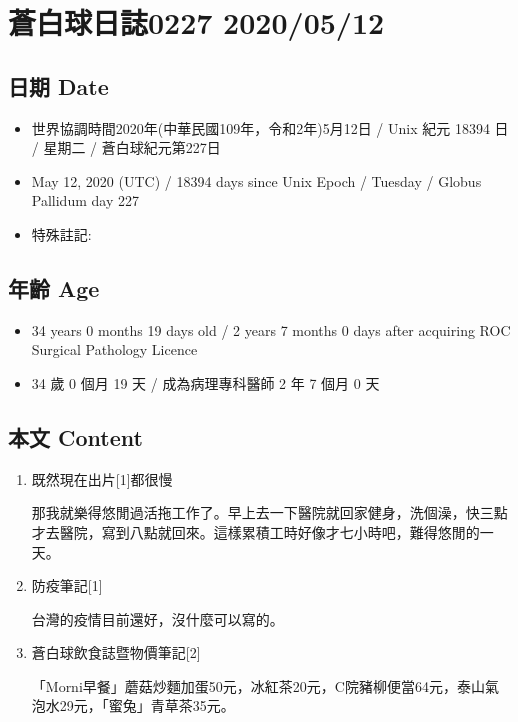 \documentclass[a5paper, 11pt
]{book}
\providecommand{\tightlist}{%
  \setlength{\itemsep}{0pt}\setlength{\parskip}{0pt}}
\begin{document}
\hypertarget{ux84bcux767dux7403ux65e5ux8a8c0227-20200512}{%
\section{蒼白球日誌0227
2020/05/12}\label{ux84bcux767dux7403ux65e5ux8a8c0227-20200512}}

\hypertarget{ux65e5ux671f-date-72}{%
\subsection{日期 Date}\label{ux65e5ux671f-date-72}}

\begin{itemize}
\tightlist
\item
  世界協調時間2020年(中華民國109年，令和2年)5月12日 / Unix 紀元 18394 日
  / 星期二 / 蒼白球紀元第227日
\item
  May 12, 2020 (UTC) / 18394 days since Unix Epoch / Tuesday / Globus
  Pallidum day 227
\item
  特殊註記:
\end{itemize}

\hypertarget{ux5e74ux9f61-age-72}{%
\subsection{年齡 Age}\label{ux5e74ux9f61-age-72}}

\begin{itemize}
\tightlist
\item
  34 years 0 months 19 days old / 2 years 7 months 0 days after
  acquiring ROC Surgical Pathology Licence
\item
  34 歲 0 個月 19 天 / 成為病理專科醫師 2 年 7 個月 0 天
\end{itemize}

\hypertarget{ux672cux6587-content-72}{%
\subsection{本文 Content}\label{ux672cux6587-content-72}}

\begin{enumerate}
\def\labelenumi{\arabic{enumi}.}
\item
  既然現在出片{[}1{]}都很慢

  那我就樂得悠閒過活拖工作了。早上去一下醫院就回家健身，洗個澡，快三點才去醫院，寫到八點就回來。這樣累積工時好像才七小時吧，難得悠閒的一天。
\item
  防疫筆記{[}1{]}

  台灣的疫情目前還好，沒什麼可以寫的。
\item
  蒼白球飲食誌暨物價筆記{[}2{]}

  「Morni早餐」蘑菇炒麵加蛋50元，冰紅茶20元，C院豬柳便當64元，泰山氣泡水29元，「蜜兔」青草茶35元。
\end{enumerate}
\end{document}
